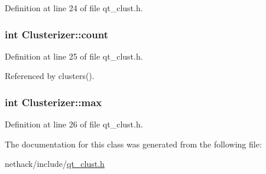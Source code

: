 Definition at line 24 of file qt\+\_\+clust.\+h.

\hypertarget{classClusterizer_aeeae38da5c079b420b7c129822d29e0a}{
\subsubsection[{count}]{\setlength{\rightskip}{0pt plus 5cm}int Clusterizer\+::count\hspace{0.3cm}{\ttfamily [private]}}}\label{classClusterizer_aeeae38da5c079b420b7c129822d29e0a}


Definition at line 25 of file qt\+\_\+clust.\+h.



Referenced by clusters().

\hypertarget{classClusterizer_ac83388e1efbfb7f0129b5d3700791c67}{
\subsubsection[{max}]{ int Clusterizer\+::max\hspace{0.3cm}{\ttfamily [private]}}}\label{classClusterizer_ac83388e1efbfb7f0129b5d3700791c67}


Definition at line 26 of file qt\+\_\+clust.\+h.



The documentation for this class was generated from the following file\+:\begin{DoxyCompactItemize}
\item 
nethack/include/\hyperlink{qt__clust_8h}{qt\+\_\+clust.\+h}\end{DoxyCompactItemize}
